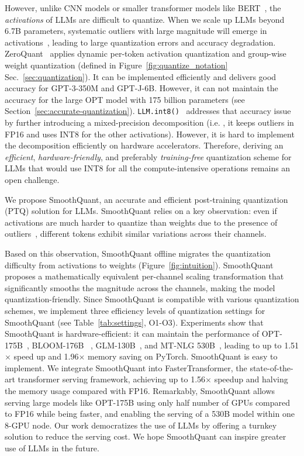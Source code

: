 However, unlike CNN models or smaller transformer models like BERT~\cite{bert}, the \emph{activations} of LLMs are difficult to quantize. When we scale up LLMs beyond 6.7B parameters, systematic outliers with large magnitude will emerge in activations~\cite{dettmers2022llmint8}, leading to large quantization errors and accuracy degradation. ZeroQuant~\citep{zeroquant} applies dynamic per-token activation quantization and group-wise weight quantization (defined in Figure~\ref{fig:quantize_notation} Sec.~\ref{sec:quantization}). It can be implemented efficiently and delivers good accuracy for GPT-3-350M and GPT-J-6B. However,  it can not maintain the accuracy for the large OPT model with 175 billion parameters (see Section~\ref{sec:accurate-quantization}).
\texttt{LLM.int8()}~\cite{dettmers2022llmint8} addresses that accuracy issue by further introducing a mixed-precision decomposition (i.e. , it keeps outliers in FP16 and uses INT8 for the other activations). However, it is hard to implement the decomposition efficiently on hardware accelerators. Therefore, deriving an \emph{efficient}, \emph{hardware-friendly}, and preferably \emph{training-free} quantization scheme for LLMs that would use INT8 for all the compute-intensive operations remains an open challenge.

We propose SmoothQuant, an accurate and efficient post-training quantization (PTQ) solution for LLMs. SmoothQuant relies on a key observation: even if activations are much harder to quantize than weights due to the presence of outliers~\cite{dettmers2022llmint8},  different tokens exhibit similar variations across their channels.

Based on this observation, SmoothQuant offline migrates the quantization difficulty from activations to weights (Figure~\ref{fig:intuition}).
SmoothQuant proposes a mathematically equivalent per-channel scaling transformation that significantly smooths the magnitude across the channels, making the model quantization-friendly. Since SmoothQuant is compatible with various quantization schemes, we implement three efficiency levels of quantization settings for SmoothQuant (see Table~\ref{tab:settings}, O1-O3). Experiments show that SmoothQuant is hardware-efficient: it can maintain the performance of OPT-175B~\cite{opt}, BLOOM-176B~\cite{scao2022bloom} , GLM-130B~\cite{zeng2022glm}, and MT-NLG 530B~\cite{smith2022using}, leading to up to 1.51$\times$ speed up and 1.96$\times$ memory saving on PyTorch. SmoothQuant is easy to implement. We integrate SmoothQuant into FasterTransformer, the state-of-the-art transformer serving framework, achieving up to 1.56$\times$ speedup and halving the memory usage compared with FP16. Remarkably, SmoothQuant allows serving large models like OPT-175B using only half number of GPUs compared to FP16 while being faster, and enabling the serving of a 530B model within one 8-GPU node. Our work democratizes the use of LLMs by offering a turnkey solution to reduce the serving cost. We hope SmoothQuant can inspire greater use of LLMs in the future.

